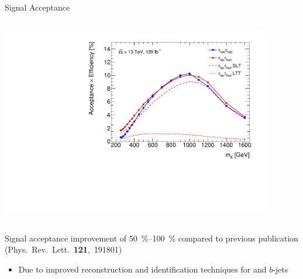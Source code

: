 \documentclass[11pt, xcolor={dvipsnames}, aspectratio=169]{beamer}
\begin{document}
\begin{frame}{Signal Acceptance}

  \vspace*{-1em}

  \begin{columns}[onlytextwidth, t]
    \centering


    \vspace{1.5em}


    \centering


    \includegraphics[width=0.88\textwidth, trim=0 0.5em 0 1em,
    clip]{selection/acceptance_resonant}
  \end{columns}

  \alert{Signal acceptance improvement of \SIrange{50}{100}{\percent}} compared
  to previous publication {\scriptsize (Phys.~Rev.~Lett.~\textbf{121},~191801)}
  \begin{itemize}

  \item Due to improved reconstruction and identification techniques for
    \tauhadvis and $b$-jets

  \end{itemize}
\end{frame}
\end{document}

